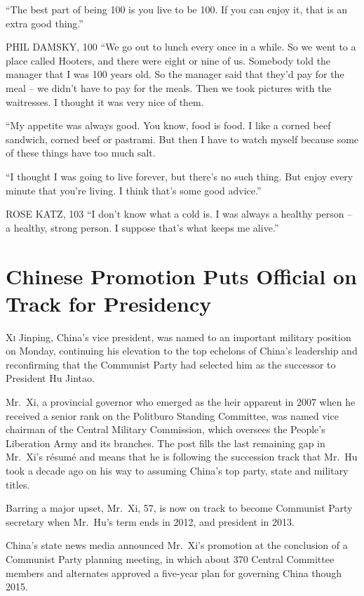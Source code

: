 ﻿\documentclass[12pt]{article}
\begin{document}
``The best part of being 100 is you live to be 100. If you can enjoy it, that is an extra good
thing.''

PHIL DAMSKY, 100 ``We go out to lunch every once in a while. So we went to a place called Hooters,
and there were eight or nine of us. Somebody told the manager that I was 100 years old. So the
manager said that they'd pay for the meal -- we didn't have to pay for the meals. Then we took
pictures with the waitresses. I thought it was very nice of them.

``My appetite was always good. You know, food is food. I like a corned beef sandwich, corned beef or
pastrami. But then I have to watch myself because some of these things have too much salt.

``I thought I was going to live forever, but there's no such thing. But enjoy every minute that
you're living. I think that's some good advice.''

ROSE KATZ, 103 ``I don't know what a cold is. I was always a healthy person -- a healthy, strong
person. I suppose that's what keeps me alive.''

\section{Chinese Promotion Puts Official on Track for Presidency}

\lettrine{X}{i} Jinping, China's vice president, was named to an important
military position on Monday, continuing his elevation to the top echelons of China's leadership and
reconfirming that the Communist Party had selected him as the successor to President Hu Jintao.

Mr.~Xi, a provincial governor who emerged as the heir apparent in 2007 when he received a senior
rank on the Politburo Standing Committee, was named vice chairman of the Central Military
Commission, which oversees the People's Liberation Army and its branches. The post fills the last
remaining gap in Mr.~Xi's r\'esum\'e and means that he is following the succession track that Mr.~Hu
took a decade ago on his way to assuming China's top party, state and military titles.

Barring a major upset, Mr.~Xi, 57, is now on track to become Communist Party secretary when Mr.~Hu's
term ends in 2012, and president in 2013.

China's state news media announced Mr.~Xi's promotion at the conclusion of a Communist Party
planning meeting, in which about 370 Central Committee members and alternates approved a five-year
plan for governing China though 2015.
\end{document}
